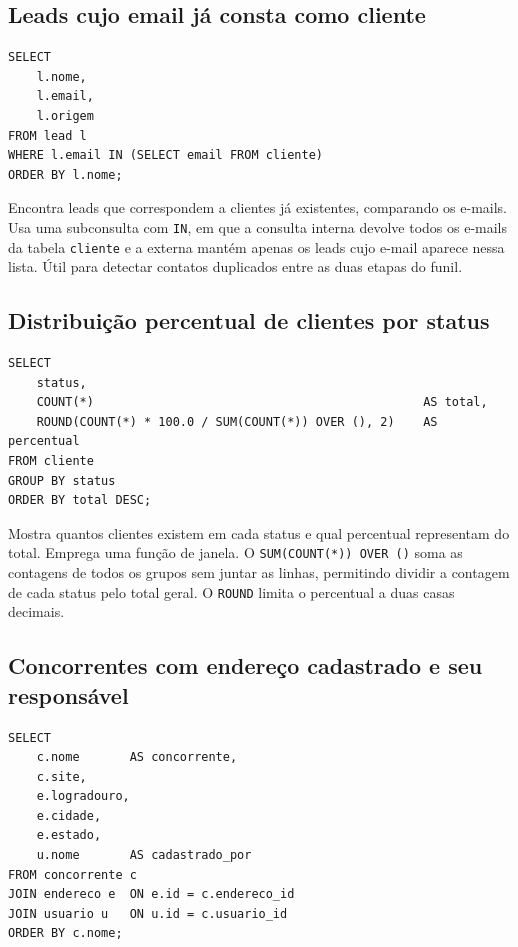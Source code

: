 \documentclass[a4paper]{article}
\begin{document}
\subsection{Leads cujo email já consta como cliente}

\begin{verbatim}
SELECT
    l.nome,
    l.email,
    l.origem
FROM lead l
WHERE l.email IN (SELECT email FROM cliente)
ORDER BY l.nome;
\end{verbatim}

Encontra leads que correspondem a clientes já existentes, comparando os e-mails. Usa uma
subconsulta com \texttt{IN}, em que a consulta interna devolve todos os e-mails da tabela
\texttt{cliente} e a externa mantém apenas os leads cujo e-mail aparece nessa lista. Útil
para detectar contatos duplicados entre as duas etapas do funil.

\subsection{Distribuição percentual de clientes por status}

\begin{verbatim}
SELECT
    status,
    COUNT(*)                                              AS total,
    ROUND(COUNT(*) * 100.0 / SUM(COUNT(*)) OVER (), 2)    AS percentual
FROM cliente
GROUP BY status
ORDER BY total DESC;
\end{verbatim}

Mostra quantos clientes existem em cada status e qual percentual representam do total.
Emprega uma função de janela. O \texttt{SUM(COUNT(*)) OVER ()} soma as contagens de todos
os grupos sem juntar as linhas, permitindo dividir a contagem de cada status pelo total
geral. O \texttt{ROUND} limita o percentual a duas casas decimais.

\subsection{Concorrentes com endereço cadastrado e seu responsável}

\begin{verbatim}
SELECT
    c.nome       AS concorrente,
    c.site,
    e.logradouro,
    e.cidade,
    e.estado,
    u.nome       AS cadastrado_por
FROM concorrente c
JOIN endereco e  ON e.id = c.endereco_id
JOIN usuario u   ON u.id = c.usuario_id
ORDER BY c.nome;
\end{verbatim}
\end{document}

